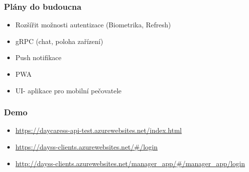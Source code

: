 \documentclass{beamer}
\begin{document}
\begin{frame}
\frametitle{Plány do budoucna}
\begin{itemize}
\item {\large Rozšířit možnosti autentizace (Biometrika, Refresh)}\\[3mm]
\item {\large  gRPC (chat, poloha zařízení)}\\[3mm]
\item {\large Push notifikace}\\[3mm]
\item {\large PWA}\\[3mm]
\item {\large UI- aplikace pro mobilní pečovatele}
\end{itemize}
\end{frame}


\begin{frame}
\frametitle{Demo}
\begin{itemize}
\item {\large \href{https://daycaress-api-test.azurewebsites.net/index.html}{https://daycaress-api-test.azurewebsites.net/index.html}
}\\[3mm]

\item {\large \href{https://dayss-clients.azurewebsites.net/\#/login}{https://dayss-clients.azurewebsites.net/\#/login}
}\\[3mm]

\item {\large \href{http://dayss-clients.azurewebsites.net/manager_app/\#/manager_app/login}{http://dayss-clients.azurewebsites.net/manager\_app/\#/manager\_app/login}
}\\[3mm]
\end{itemize}
\end{frame}
\end{document}
